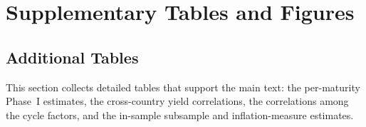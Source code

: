 \chapter{Supplementary Tables and Figures}
\label{ch:appendix}

\section{Additional Tables}
\label{app:per-country}
This section collects detailed tables that support the main text: the per-maturity Phase~I estimates, the cross-country yield correlations, the correlations among the cycle factors, and the in-sample subsample and inflation-measure estimates.

\begin{table}[htbp]
  \caption{Phase~I by maturity: predicting individual excess returns with the
    cycle factor}
  \label{tab:mr-phase1-mat}
  \centering
  
\end{table}

\begin{table}[htbp]
  \caption{Cross-country correlation of the ten-year zero-coupon yield}
  \label{tab:dh-t1-corr}
  \centering
  
\end{table}

\begin{table}[htbp]
  \caption{Summary statistics of the non-yield inputs}
  \label{tab:dh-t1b-inputs}
  \centering
  
\end{table}

\begin{table}[htbp]
  \caption{Correlations among the local cycle factors and with the global factor}
  \label{tab:mr-gcf-corr}
  \centering
  
\end{table}

\begin{table}[htbp]
  \caption{Currency return versus the local cycle factor}
  \label{tab:fx-cycle}
  \centering
  
\end{table}

\begin{table}[htbp]
  \caption{In-sample predictability across subsamples}
  \label{tab:rob-sub-is}
  \centering
  
\end{table}

